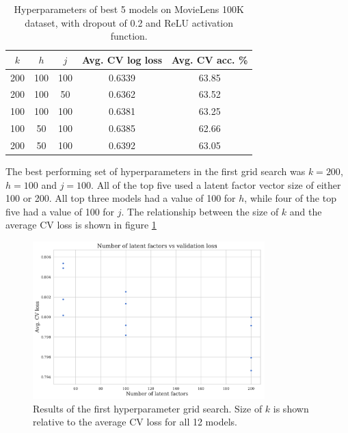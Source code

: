 \begin{table}[H]
\centering
\begin{tabular}{c | c | c | c | c}
\toprule
\textbf{$k$} & \textbf{$h$} & \textbf{$j$} & \textbf{Avg. CV log loss} & \textbf{Avg. CV acc.} \% \\
\midrule
200 & 100 & 100 & 0.6339 & 63.85 \\
\midrule
200 & 100 & 50 & 0.6362 & 63.52 \\
\midrule
100 & 100 & 100 & 0.6381 & 63.25 \\
\midrule
100 & 50 & 100 & 0.6385 & 62.66 \\
\midrule
200 & 50 & 100 & 0.6392 & 63.05 \\
\bottomrule
\end{tabular}
\caption[MovieLens 100K grid search results -- number of nodes]{Hyperparameters of best 5 models on MovieLens 100K dataset, with dropout of 0.2 and ReLU activation function.}
\label{tab:ml100k-grid-results1}
\end{table}

The best performing set of hyperparameters in the first grid search was $k=200$, $h=100$ and $j=100$. All of the top five used a latent factor vector size of either 100 or 200. All top three models had a value of 100 for $h$, while four of the top five had a value of 100 for $j$. The relationship between the size of $k$ and the average CV loss is shown in figure \ref{fig:5-latent-size}

\begin{figure}[H]
\centering
\includegraphics[width=0.8\textwidth]{Figures/5_ml100k-latent-factors.pdf}
\decoRule
\caption[Size of $k$]{Results of the first hyperparameter grid search. Size of $k$ is shown relative to the average CV loss for all 12 models.}
\label{fig:5-latent-size}
\end{figure}


